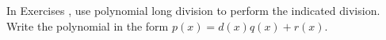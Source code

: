 {\noindent In Exercises}
{, use polynomial long division to perform the indicated division.  Write the polynomial in the form $p(x) = d(x)q(x) + r(x)$.}

